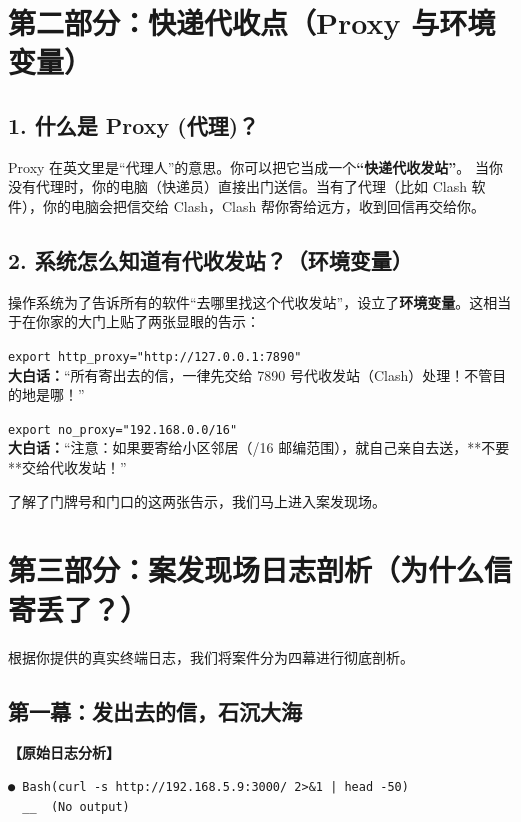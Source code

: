 \documentclass[12pt,a4paper]{ctexart}
\begin{document}
\newpage
\section{第二部分：快递代收点（Proxy 与环境变量）}

\subsection{1. 什么是 Proxy (代理)？}
Proxy 在英文里是“代理人”的意思。你可以把它当成一个\textbf{“快递代收发站”}。
当你没有代理时，你的电脑（快递员）直接出门送信。当有了代理（比如 Clash 软件），你的电脑会把信交给 Clash，Clash 帮你寄给远方，收到回信再交给你。

\subsection{2. 系统怎么知道有代收发站？（环境变量）}
操作系统为了告诉所有的软件“去哪里找这个代收发站”，设立了\textbf{环境变量}。这相当于在你家的大门上贴了两张显眼的告示：

\begin{tcolorbox}[colback=red!5,colframe=red!75!black,title=第一张告示：强制代收规则 (http\_proxy),boxrule=0.5pt,arc=3mm]
\texttt{export http\_proxy="http://127.0.0.1:7890"} \\
\textbf{大白话：}“所有寄出去的信，一律先交给 7890 号代收发站（Clash）处理！不管目的地是哪！”
\end{tcolorbox}

\begin{tcolorbox}[colback=green!5,colframe=green!75!black,title=第二张告示：豁免白名单 (no\_proxy),boxrule=0.5pt,arc=3mm]
\texttt{export no\_proxy="192.168.0.0/16"} \\
\textbf{大白话：}“注意：如果要寄给小区邻居（/16 邮编范围），就自己亲自去送，**不要**交给代收发站！”
\end{tcolorbox}

了解了门牌号和门口的这两张告示，我们马上进入案发现场。

\newpage
\section{第三部分：案发现场日志剖析（为什么信寄丢了？）}

根据你提供的真实终端日志，我们将案件分为四幕进行彻底剖析。

\subsection{第一幕：发出去的信，石沉大海}
\textbf{【原始日志分析】}
\begin{lstlisting}[style=terminal]
● Bash(curl -s http://192.168.5.9:3000/ 2>&1 | head -50)
  __  (No output)
\end{lstlisting}
\end{document}
